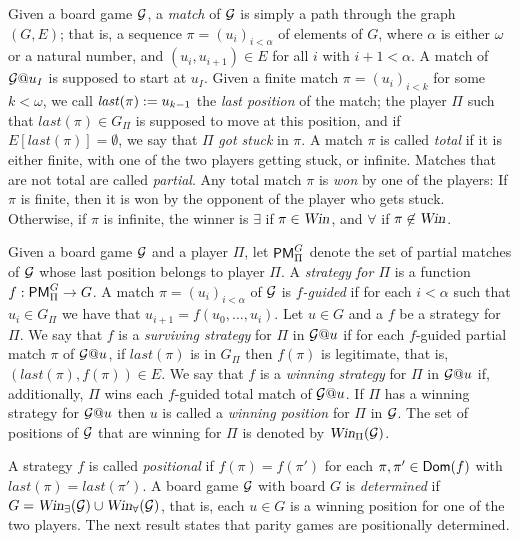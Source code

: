 Given a board game $\mathcal{G}$, a \emph{match} of $\mathcal{G}$ is simply a path
through the graph $(G,E)$; that is, a sequence $\pi = (u_i)_{i< \alpha}$ of
elements of $G$, where $\alpha$ is either $\omega$ or a natural number,
and $(u_i,u_{i+1}) \in E$ for all $i$ with $i+1 < \alpha$.
A match of $\mathcal{G}@u_{I}$ is supposed to start at $u_{I}$.
Given a finite match $\pi = (u_i)_{i< k}$ for some $k<\omega$, we call
$\mathit{last}(\pi) \mathrel{:=} u_{k-1}$ the \emph{last position} of the match; the
player $\Pi$ such that $\mathit{last}(\pi) \in G_{\Pi}$ is supposed to move
at this position, and if $E[\mathit{last}(\pi)] = \emptyset$, we say that
$\Pi$ \emph{got stuck} in $\pi$.
%
A match $\pi$ is called \emph{total} if it is either finite, with one of the
two players getting stuck, or infinite. Matches that are not total are called
\emph{partial}.
Any total match $\pi$ is \emph{won} by one of the players:
If $\pi$ is finite, then it is won by the opponent of the player who gets stuck.
Otherwise, if $\pi$ is infinite, the winner is $\exists$ if $\pi \in
\win$, and $\forall$ if $\pi \not\in \win$.

Given a board game $\mathcal{G}$ and a player $\Pi$, let $\mathsf{PM}^{G}_{\Pi}$ denote
the set of partial matches of $\mathcal{G}$ whose last position belongs to player
$\Pi$.
A \emph{strategy for $\Pi$} is a function $f:\mathsf{PM}^{G}_{\Pi}\to G$.
A match $\pi  = (u_i)_{i< \alpha}$ of $\mathcal{G}$ is
\emph{$f$-guided} if for each $i < \alpha$ such that $u_i \in G_{\Pi}$ we
have that $u_{i+1} = f(u_0,\dots,u_i)$.
%
Let $u \in G$ and a $f$ be a strategy for $\Pi$.
We say that $f$ is a \emph{surviving strategy} for $\Pi$ in $\mathcal{G}@u$ if
for each $f$-guided partial match $\pi$ of $\mathcal{G}@u$, if $\mathit{last}(\pi)$
is in $G_{\Pi}$ then $f(\pi)$ is legitimate, that is, $(\mathit{last}(\pi),
f(\pi)) \in E$.
We say that $f$ is a \emph{winning strategy} for $\Pi$ in $\mathcal{G}@u$ if,
additionally, $\Pi$ wins each $f$-guided total match of $\mathcal{G}@u$.
%
If $\Pi$ has a winning strategy for $\mathcal{G}@u$ then $u$ is called a 
\emph{winning position} for $\Pi$ in $\mathcal{G}$.
The set of positions of $\mathcal{G}$ that are winning for $\Pi$ is denoted by
$\win_{\Pi}(\mc{G})$.

A strategy $f$ is called \emph{positional} if $f(\pi) = f(\pi')$ for
each $\pi,\pi'\in \mathsf{Dom}(f)$ with $\mathit{last}(\pi) = 
\mathit{last}(\pi')$.
A board game $\mathcal{G}$ with board $G$ is \emph{determined} if $G = \win_{\exists}(\mc{G}) \cup \win_{\forall}(\mc{G})$, that is, each $u \in G$ is a winning position for one of the two players.
%
The next result states that parity games are positionally determined.

